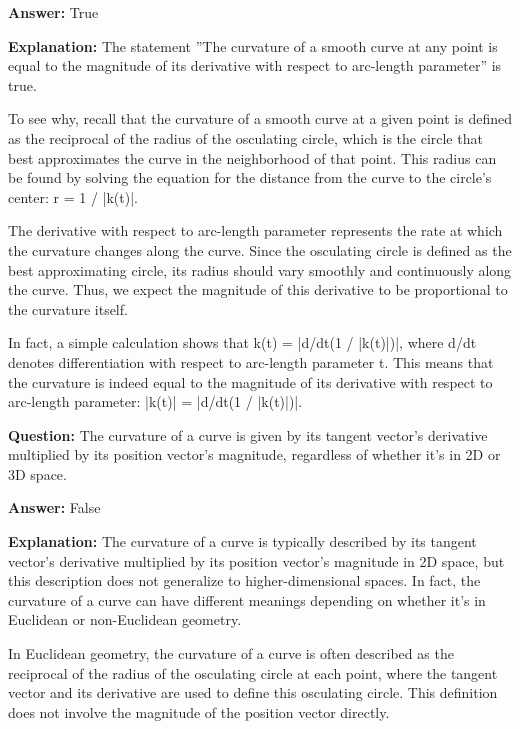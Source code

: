 \documentclass{article}
\begin{document}
                \textbf{Answer:} True

                \textbf{Explanation:} The statement ''The curvature of a smooth curve at any point is equal to the magnitude of its derivative with respect to arc-length parameter'' is true.

To see why, recall that the curvature of a smooth curve at a given point is defined as the reciprocal of the radius of the osculating circle, which is the circle that best approximates the curve in the neighborhood of that point. This radius can be found by solving the equation for the distance from the curve to the circle's center: r = 1 / |k(t)|.

The derivative with respect to arc-length parameter represents the rate at which the curvature changes along the curve. Since the osculating circle is defined as the best approximating circle, its radius should vary smoothly and continuously along the curve. Thus, we expect the magnitude of this derivative to be proportional to the curvature itself.

In fact, a simple calculation shows that k(t) = |d/dt(1 / |k(t)|)|, where d/dt denotes differentiation with respect to arc-length parameter t. This means that the curvature is indeed equal to the magnitude of its derivative with respect to arc-length parameter: |k(t)| = |d/dt(1 / |k(t)|)|.
                
                \vspace{0.5cm} 
        
            
                \textbf {Question:} The curvature of a curve is given by its tangent vector's derivative multiplied by its position vector's magnitude, regardless of whether it's in 2D or 3D space.
                
                \textbf{Answer:} False

                \textbf{Explanation:} The curvature of a curve is typically described by its tangent vector's derivative multiplied by its position vector's magnitude in 2D space, but this description does not generalize to higher-dimensional spaces. In fact, the curvature of a curve can have different meanings depending on whether it's in Euclidean or non-Euclidean geometry.

In Euclidean geometry, the curvature of a curve is often described as the reciprocal of the radius of the osculating circle at each point, where the tangent vector and its derivative are used to define this osculating circle. This definition does not involve the magnitude of the position vector directly.
\end{document}
